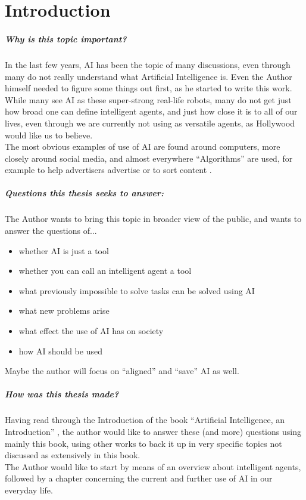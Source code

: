 \chapter{Introduction}
\paragraph{Why is this topic important?}
In the last few years, AI has been the topic of many discussions, even through many do not really understand what Artificial Intelligence is.
Even the Author himself needed to figure some things out first, as he started to write this work.\\While many see AI as these super-strong real-life robots, many do not get just how broad one can define intelligent agents, and just how close it is to all of our lives, even through we are currently not using as versatile agents, as Hollywood would like us to believe.\\The most obvious examples of use of AI are found around computers, more closely around social media, and almost everywhere “Algorithms” are used, for example to help advertisers advertise \cite{facebookWerbungAufInstagram} or to sort content \cite{googleFunktioniertGoogleSucheSuchalgorithmen}.
\paragraph{Questions this thesis seeks to answer:}
The Author wants to bring this topic in broader view of the public, and wants to answer the questions of... 
\begin{itemize}
    \item whether AI is just a tool
    \item whether you can call an intelligent agent a tool
    \item what previously impossible to solve tasks can be solved using AI
    \item what new problems arise
    \item what effect the use of AI has on society
    \item how AI should be used
\end{itemize}
Maybe the author will focus on “aligned” and “save” AI as well.
\paragraph{How was this thesis made?}
Having read through the Introduction of the book “Artificial Intelligence, an Introduction” \cite{russellArtificialIntelligenceModern2010}, the author would like to answer these (and more) questions using mainly this book, using other works to back it up in very specific topics not discussed as extensively in this book.\\The Author would like to start by means of an overview about intelligent agents, followed by a chapter concerning the current and further use of AI in our everyday life.